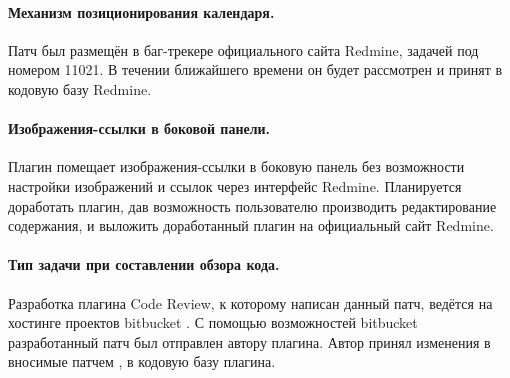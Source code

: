 \paragraph{Механизм позиционирования календаря.}
Патч был размещён в баг-трекере официального сайта Redmine, задачей под номером
11021. В течении ближайшего времени он будет рассмотрен и принят в кодовую базу
Redmine.

\paragraph{Изображения-ссылки в боковой панели.}
Плагин помещает изображения-ссылки в боковую панель без возможности настройки
изображений и ссылок через интерфейс Redmine. Планируется доработать плагин,
дав возможность пользователю производить редактирование содержания, и выложить
доработанный плагин на официальный сайт Redmine.

\paragraph{Тип задачи при составлении обзора кода.}
Разработка плагина Code Review, к которому написан данный патч, ведётся на
хостинге проектов bitbucket \cite{bitbucket}. С помощью возможностей bitbucket
разработанный патч был отправлен автору плагина. Автор принял изменения в
вносимые патчем \cite{pull-request}, в кодовую базу плагина.


